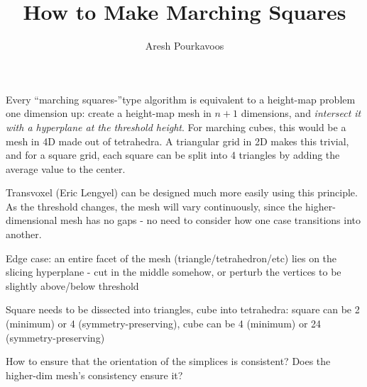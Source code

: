 \documentclass{article}
\begin{document}
\title{How to Make Marching Squares}
\author{Aresh Pourkavoos}
\maketitle

Every ``marching squares-''type algorithm is equivalent to a height-map problem one dimension up:
create a height-map mesh in $n+1$ dimensions, and \textit{intersect it with a hyperplane at the threshold height}.
For marching cubes, this would be a mesh in 4D made out of tetrahedra.
A triangular grid in 2D makes this trivial, and for a square grid,
each square can be split into 4 triangles by adding the average value to the center.

Transvoxel (Eric Lengyel) can be designed much more easily using this principle.
As the threshold changes, the mesh will vary continuously,
since the higher-dimensional mesh has no gaps -
no need to consider how one case transitions into another.

Edge case: an entire facet of the mesh (triangle/tetrahedron/etc) lies on the slicing hyperplane -
cut in the middle somehow, or perturb the vertices to be slightly above/below threshold

Square needs to be dissected into triangles, cube into tetrahedra:
square can be 2 (minimum) or 4 (symmetry-preserving),
cube can be 4 (minimum) or 24 (symmetry-preserving)

How to ensure that the orientation of the simplices is consistent?
Does the higher-dim mesh's consistency ensure it?

\end{document}
